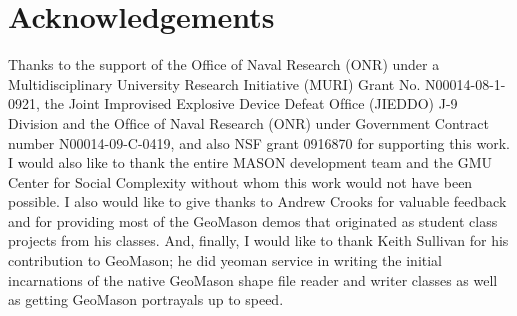 \documentclass[twoside,10pt]{book}
\begin{document}
\cleardoublepage %
\chapter*{Acknowledgements} %
\thispagestyle{empty} %

Thanks to the support of the Office of Naval Research (ONR) under a
Multidisciplinary University Research Initiative (MURI) Grant
No. N00014-08-1-0921, the Joint Improvised Explosive Device Defeat
Ofﬁce (JIEDDO) J-9 Division and the Ofﬁce of Naval Research (ONR)
under Government Contract number N00014-09-C-0419, and also NSF grant
0916870 for supporting this work. I would also like to thank the
entire MASON development team and the GMU Center for Social Complexity
without whom this work would not have been possible.  I also would
like to give thanks to Andrew Crooks for valuable feedback and
for providing most of the GeoMason demos that originated as student
class projects from his classes.  And, finally, I would like to thank
Keith Sullivan for his contribution to GeoMason; he did yeoman
service in writing the initial incarnations of the native GeoMason shape file reader
and writer classes as well as getting GeoMason portrayals up to speed.


\cleardoublepage
\footnotesize
{}
\printindex
\end{document}
